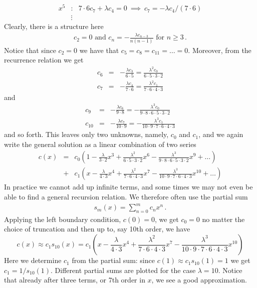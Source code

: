 \begin{example}
\begin{eqnarray}
		x^5 &:& 7\cdot6 c_7 + \lambda c_4 = 0 \ \implies \ c_7 = -\lambda c_4/(7\cdot6) \nonumber \\
		&\vdots& \nonumber
	\end{eqnarray}
	Clearly, there is a structure here 
	\begin{eqnarray}
		c_2 = 0 \text{ and } c_n = -\frac{\lambda c_{n-3}}{n(n-1)} \text{ for } n \geq 3 \, .
	\end{eqnarray}
	Notice that since $c_2=0$ we have that $c_5=c_8=c_{11}=\ldots=0$. Moreover, from the recurrence
	relation we get
	\begin{eqnarray}
		c_6 &=& -\frac{\lambda c_3}{6\cdot5} =  \frac{\lambda^2c_0}{6\cdot5\cdot3\cdot2} \nonumber \\  
		c_7 &=& -\frac{\lambda c_4}{7\cdot6} = \frac{\lambda^2c_1}{7\cdot6\cdot4\cdot3} \nonumber 
	\end{eqnarray}
	and 
	\begin{eqnarray}
		c_9 &=& -\frac{\lambda c_6}{9\cdot8} = -\frac{\lambda^3c_0}{9\cdot8\cdot6\cdot5\cdot3\cdot2}
		\nonumber \\
		c_{10} &=& -\frac{\lambda c_7}{10\cdot9} = -\frac{\lambda^3c_1}{10\cdot9\cdot7\cdot6\cdot4\cdot3} 
		\nonumber
	\end{eqnarray}
	and so forth. This leaves only two unknowns, namely, $c_0$ and $c_1$, and we again write
	the general solution as a linear combination of two series 
	\begin{eqnarray}
		c(x) &=& c_0 \left(1 - \frac{\lambda}{3\cdot2}x^3 + \frac{\lambda^2}{6\cdot5\cdot3\cdot2}x^6 -
		\frac{\lambda^3}{9\cdot8\cdot6\cdot5\cdot3\cdot2}x^9 + \ldots \right) \nonumber \\
		&+& c_1 \left(
			x - \frac{\lambda}{4\cdot3}x^4 + \frac{\lambda^2}{7\cdot6\cdot4\cdot3}x^7 -
			\frac{\lambda^3}{10\cdot9\cdot7\cdot6\cdot4\cdot3}x^{10} + \ldots \right)
		\label{eq:stst:ssolEx1}
	\end{eqnarray}
	In practice we cannot add up infinite terms, and some times we may not even 
	be able to find a general recursion relation. We therefore often use the partial sum
	\begin{eqnarray}
		s_m(x) = \sum_{n=0}^{m} c_n x^n \, .
	\end{eqnarray}
	Applying the left boundary condition, $c(0)=0$, we get $c_0=0$ no matter the choice of 
	truncation and then up to, say 10th order, we have 
	\begin{equation}
		c(x) \approx c_1 s_{10}(x) = c_1 \left(
			x - \frac{\lambda}{4\cdot3}x^4 + \frac{\lambda^2}{7\cdot6\cdot4\cdot3}x^7 - 
			\frac{\lambda^3}{10\cdot9\cdot7\cdot6\cdot4\cdot3}x^{10} \right)
	\end{equation}
	Here we determine $c_1$ from the partial sum: since $c(1)\approx c_1 s_{10}(1)=1$ we
	get $c_1 = 1/s_{10}(1)$. Different partial sums are plotted for the case $\lambda = 10$. Notice that already after
	three terms, or 7th order in $x$, we see a good approximation.
\end{example}
	
